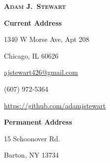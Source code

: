 
\begin{center}

    \textbf{\textsc{\Large Adam J.\ Stewart}}

\end{center}

\vspace{-12pt}

\begin{multicols}{3}

    \begin{flushleft}

        \textbf{Current Address}

        1340 W Morse Ave, Apt 208

        Chicago, IL 60626

    \end{flushleft}

    \columnbreak

    \begin{center}

        \href{mailto:ajstewart426@gmail.com}{ajstewart426@gmail.com}

        (607) 972-5364

        \href{https://github.com/adamjstewart}{https://github.com/adamjstewart}

    \end{center}

    \columnbreak

    \begin{flushright}

        \textbf{Permanent Address}

        15 Schoonover Rd.

        Barton, NY 13734

    \end{flushright}

\end{multicols}
